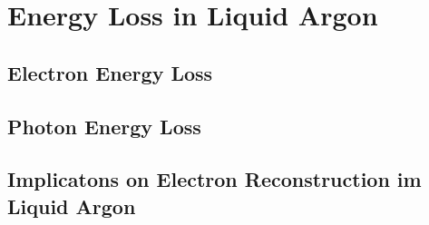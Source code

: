 % 

\chapter{\label{ch:4-energyloss}Energy Loss in Liquid Argon} 

\minitoc

\section{Electron Energy Loss}

\section{Photon Energy Loss}

\section{Implicatons on Electron Reconstruction im Liquid Argon}


